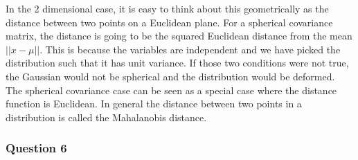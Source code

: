 \documentclass[10pt, a4paper, twocolumn]{article} %
\begin{document}
In the 2 dimensional case, it is easy to think about this geometrically as the distance between two points on a Euclidean plane. For a spherical covariance matrix, the distance is going to be the squared Euclidean distance from the mean $||x - \mu||$. This is because the variables are independent and we have picked the distribution such that it has unit variance. If those two conditions were not true, the Gaussian would not be spherical and the distribution would be deformed. The spherical covariance case can be seen as a special case where the distance function is Euclidean. In general the distance between two points in a distribution is called the Mahalanobis distance.

\subsubsection*{Question 6}
\end{document}
